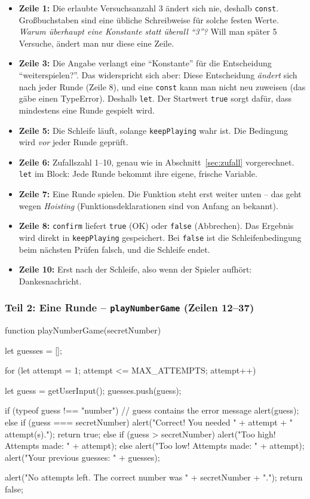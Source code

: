 \documentclass[a4paper,11pt]{article}
\begin{document}
\begin{itemize}
\item \textbf{Zeile 1:} Die erlaubte Versuchsanzahl 3 ändert sich nie, deshalb \texttt{const}. Großbuchstaben sind
      eine übliche Schreibweise für solche festen Werte. \emph{Warum überhaupt eine Konstante statt überall "`3"'?}
      Will man später 5 Versuche, ändert man nur diese eine Zeile.
\item \textbf{Zeile 3:} Die Angabe verlangt eine "`Konstante"' für die Entscheidung "`weiterspielen?"'. Das
      widerspricht sich aber: Diese Entscheidung \emph{ändert} sich nach jeder Runde (Zeile 8), und eine
      \texttt{const} kann man nicht neu zuweisen (das gäbe einen TypeError). Deshalb \texttt{let}. Der Startwert
      \lstinline|true| sorgt dafür, dass mindestens eine Runde gespielt wird.
\item \textbf{Zeile 5:} Die Schleife läuft, solange \texttt{keepPlaying} wahr ist. Die Bedingung wird \emph{vor}
      jeder Runde geprüft.
\item \textbf{Zeile 6:} Zufallszahl 1--10, genau wie in Abschnitt~\ref{sec:zufall} vorgerechnet. \texttt{let} im
      Block: Jede Runde bekommt ihre eigene, frische Variable.
\item \textbf{Zeile 7:} Eine Runde spielen. Die Funktion steht erst weiter unten -- das geht wegen \emph{Hoisting}
      (Funktionsdeklarationen sind von Anfang an bekannt).
\item \textbf{Zeile 8:} \texttt{confirm} liefert \lstinline|true| (OK) oder \lstinline|false| (Abbrechen). Das Ergebnis
      wird direkt in \texttt{keepPlaying} gespeichert. Bei \lstinline|false| ist die Schleifenbedingung beim nächsten
      Prüfen falsch, und die Schleife endet.
\item \textbf{Zeile 10:} Erst nach der Schleife, also wenn der Spieler aufhört: Dankesnachricht.
\end{itemize}

\subsubsection*{Teil 2: Eine Runde -- \texttt{playNumberGame} (Zeilen 12--37)}
\begin{code}[firstnumber=12]
function playNumberGame(secretNumber) {
    let guesses = [];

    for (let attempt = 1; attempt <= MAX_ATTEMPTS; attempt++) {
        let guess = getUserInput();
        guesses.push(guess);

        if (typeof guess !== "number") {
            // guess contains the error message
            alert(guess);
        } else if (guess === secretNumber) {
            alert("Correct! You needed " + attempt + " attempt(s).");
            return true;
        } else {
            if (guess > secretNumber) {
                alert("Too high! Attempts made: " + attempt);
            } else {
                alert("Too low! Attempts made: " + attempt);
            }
            alert("Your previous guesses: " + guesses);
        }
    }

    alert("No attempts left. The correct number was " + secretNumber + ".");
    return false;
}
\end{code}
\end{document}
